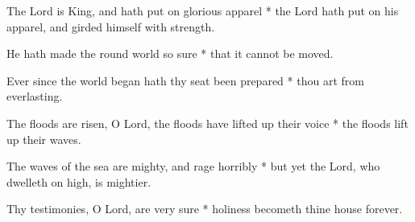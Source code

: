 The Lord is King, and hath put on glorious apparel * the Lord hath put on his apparel, and girded himself with strength.

He hath made the round world so sure * that it cannot be moved.

Ever since the world began hath thy seat been prepared * thou art from everlasting.

The floods are risen, O Lord, the floods have lifted up their voice * the floods lift up their waves.

The waves of the sea are mighty, and rage horribly * but yet the Lord, who dwelleth on high, is mightier.

Thy testimonies, O Lord, are very sure * holiness becometh thine house forever.